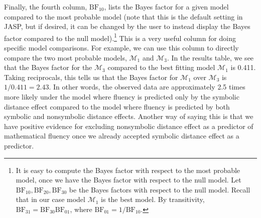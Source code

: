 \documentclass[english,,doc,floatsintext]{apa6}
\let\rmarkdownfootnote\footnote%
\def\footnote{\protect\rmarkdownfootnote}
\begin{document}
Finally, the fourth column, \(\text{BF}_{10}\), lists the Bayes factor for a given model compared to the most probable model (note that this is the default setting in JASP, but if desired, it can be changed by the user to instead display the Bayes factor compared to the null model).\footnote{It is easy to compute the Bayes factor with respect to the most probable model, once we have the Bayes factor with respect to the null model. Let \(\text{BF}_{10}, \text{BF}_{20}, \text{BF}_{30}\) be the Bayes factors with respect to the null model. Recall that in our case model \(\mathcal{M}_{1}\) is the best model. By transitivity, \(\text{BF}_{31} =\text{BF}_{30} \text{BF}_{01}\), where \(\text{BF}_{01}= 1/\text{BF}_{10}\).} This is a very useful column for doing specific model comparisons. For example, we can use this column to directly compare the two most probable models, \(\mathcal{M}_{1}\) and \(\mathcal{M}_{3}\). In the results table, we see that the Bayes factor for the \(\mathcal{M}_{3}\) compared to the best fitting model \(\mathcal{M}_{1}\) is 0.411. Taking reciprocals, this tells us that the Bayes factor for \(\mathcal{M}_{1}\) over \(\mathcal{M}_{3}\) is \(1/0.411 = 2.43\). In other words, the observed data are approximately 2.5 times more likely under the model where fluency is predicted only by the symbolic distance effect compared to the model where fluency is predicted by both symbolic and nonsymbolic distance effects. Another way of saying this is that we have positive evidence for excluding nonsymbolic distance effect as a predictor of mathematical fluency once we already accepted symbolic distance effect as a predictor.
\end{document}
